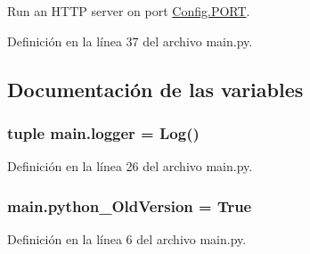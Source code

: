 Run an H\-T\-T\-P server on port \hyperlink{class_config_1_1_config_aef20c383d5c356bfc5771e132ad241df}{Config.\-P\-O\-R\-T}. 



Definición en la línea 37 del archivo main.\-py.



\subsection{Documentación de las variables}
\hypertarget{namespacemain_ad92bd309cc4d798ebf9c4c3680dc381e}{
\subsubsection[{logger}]{\setlength{\rightskip}{0pt plus 5cm}tuple main.\-logger = {\bf Log}()}}\label{namespacemain_ad92bd309cc4d798ebf9c4c3680dc381e}


Definición en la línea 26 del archivo main.\-py.

\hypertarget{namespacemain_a8c220c73f6ecc6956eba2406eba99d7c}{
\subsubsection[{python\-\_\-\-Old\-Version}]{\setlength{\rightskip}{0pt plus 5cm}main.\-python\-\_\-\-Old\-Version = True}}\label{namespacemain_a8c220c73f6ecc6956eba2406eba99d7c}


Definición en la línea 6 del archivo main.\-py.

